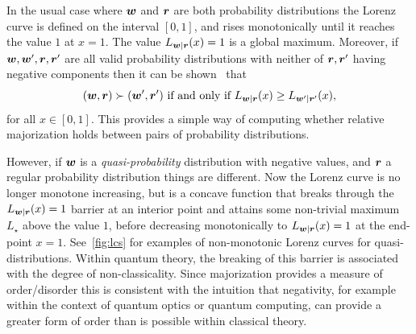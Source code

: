 \documentclass[pra,
aps,
twocolumn,
superscriptaddress,
groupedaddress,
nofootinbib,
reprint
]{revtex4-1}
\begin{document}
In the usual case where $\boldsymbol{w}$ and $\boldsymbol{r}$ are both probability distributions the Lorenz curve is defined on the interval $[0,1]$, and rises monotonically until it reaches the value $1$ at $x=1$. The value $L_{\boldsymbol{w}|\boldsymbol{r}}(x) = 1$ is a global maximum. Moreover, if $\boldsymbol{w}, \boldsymbol{w}', \boldsymbol{r}, \boldsymbol{r}'$ are all valid probability distributions with neither of $\boldsymbol{r},\boldsymbol{r}'$ having negative components then it can be shown~\cite{ruch_mixing_1978} that
\begin{equation}
(\boldsymbol{w}, \boldsymbol{r}) \succ (\boldsymbol{w}', \boldsymbol{r}') \mbox{ if and only if } L_{\boldsymbol{w} |\boldsymbol{r}}(x) \ge L_{\boldsymbol{w}' |\boldsymbol{r}'}(x),
\end{equation}
for all $x \in [0,1]$.
This provides a simple way of computing whether relative majorization holds between pairs of probability distributions.

However, if $\boldsymbol{w}$ is a \emph{quasi-probability} distribution with negative values, and $\boldsymbol{r}$ a regular probability distribution things are different. Now the Lorenz curve is no longer monotone increasing, but is a concave function that breaks through the $L_{\boldsymbol{w}|\boldsymbol{r}}(x) = 1$ barrier at an interior point and attains some non-trivial maximum $L_\star$ above the value $1$, before decreasing monotonically to $L_{\boldsymbol{w}|\boldsymbol{r}}(x)= 1$ at the end-point $x=1$. See~\cref{fig:lcs} for examples of non-monotonic Lorenz curves for quasi-distributions. Within quantum theory, the breaking of this barrier is associated with the degree of non-classicality. Since majorization provides a measure of order/disorder this is consistent with the intuition that negativity, for example within the context of quantum optics or quantum computing, can provide a greater form of order than is possible within classical theory.
\end{document}
